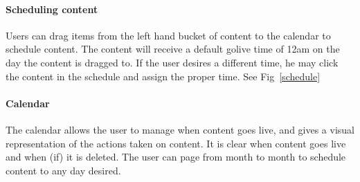 \documentclass{article}
\begin{document}
\begin{description}
\paragraph{Scheduling content}
Users can drag items from the left hand bucket of content to the
calendar to schedule content.  The content will receive a default
golive time of 12am on the day the content is dragged to.  If the user
desires a different time, he may click the content in the schedule and
assign the proper time. See Fig~\ref{schedule}
\paragraph{Calendar}
The calendar allows the user to manage when content goes live, and
gives a visual representation of the actions taken on content.  It is
clear when content goes live and when (if) it is deleted.  The user
can page from month to month to schedule content to any day desired.

\end{description}
\end{document}
